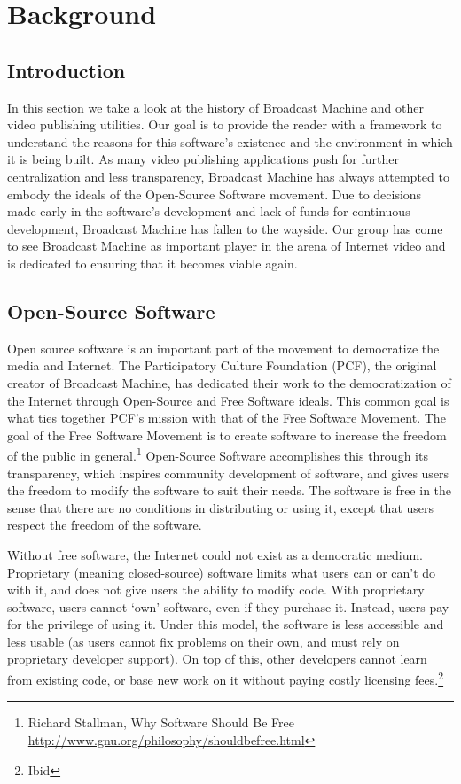 \documentclass[a4paper,12pt]{report}
\newcommand{\scare}[1]{`#1'}
\begin{document}
\chapter{Background}

\section{Introduction}

In this section we take a look at the history of Broadcast Machine and other video publishing utilities.
Our goal is to provide the reader with a framework to understand the reasons for this software's existence and the environment in which it is being built.
As many video publishing applications push for further centralization and less transparency, Broadcast Machine has always attempted to embody the ideals of the Open-Source Software movement.
Due to decisions made early in the software's development and lack of funds for continuous development,  Broadcast Machine has fallen to the wayside.
Our group has come to see Broadcast Machine as important player in the arena of Internet video and is dedicated to ensuring that it 
becomes viable again.

\section{Open-Source Software}
Open source software is an important part of the movement to democratize the media and Internet. 
The Participatory Culture Foundation (PCF), the original creator of Broadcast Machine, has dedicated their work to the democratization of the Internet through Open-Source and Free Software ideals.
This common goal is what ties together PCF's mission with that of the Free Software Movement. 
The goal of the Free Software Movement is to create software to increase the freedom of the public in general.\footnote{Richard Stallman, Why Software Should Be Free \url{http://www.gnu.org/philosophy/shouldbefree.html}}
Open-Source Software accomplishes this through its transparency, which inspires community development of software, and gives users the freedom to modify the software to suit their needs.
The software is free in the sense that there are no conditions in distributing or using it, except that users respect the freedom of the software.

Without free software, the Internet could not exist as a democratic medium.
Proprietary (meaning closed-source) software limits what users can or can't do with it, and does not give users the ability to modify code.
With proprietary software, users cannot \scare{own} software, even if they purchase it.
Instead, users pay for the privilege of using it.
Under this model, the software is less accessible and less usable (as users cannot fix problems on their own, and must rely on proprietary developer support).
On top of this, other developers cannot learn from existing code, or base new work on it without paying costly licensing fees.\footnote{Ibid} 
\end{document}
